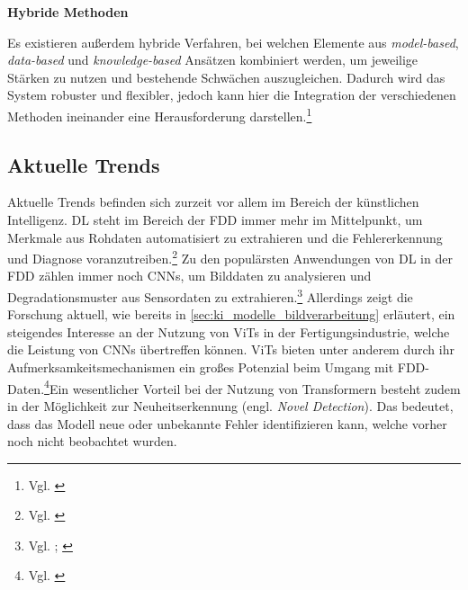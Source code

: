 \textbf{Hybride Methoden}

Es existieren außerdem hybride Verfahren, bei welchen Elemente aus \textit{model-based}, \textit{data-based} und \textit{knowledge-based} Ansätzen kombiniert werden, um jeweilige Stärken zu nutzen und bestehende Schwächen auszugleichen. Dadurch wird das System robuster und flexibler, jedoch kann hier die Integration der verschiedenen Methoden ineinander eine Herausforderung darstellen.\footnote{Vgl. \cite[S. 22 f.]{mercorelli_recent_2024}}

\subsection{Aktuelle Trends}
Aktuelle Trends befinden sich zurzeit vor allem im Bereich der künstlichen Intelligenz. \ac{DL} steht im Bereich der \ac{FDD} immer mehr im Mittelpunkt, um Merkmale aus Rohdaten automatisiert zu extrahieren und die Fehlererkennung und Diagnose voranzutreiben.\footnote{Vgl. \cite[S. 5991]{wen_new_2018}}
Zu den populärsten Anwendungen von \ac{DL} in der \ac{FDD} zählen immer noch \acp{CNN}, um Bilddaten zu analysieren und Degradationsmuster aus Sensordaten zu extrahieren.\footnote{Vgl. \cite{wu_transformer-based_2023}; \cite[S.  5991]{wen_new_2018}} Allerdings zeigt die Forschung aktuell, wie bereits in \ref{sec:ki_modelle_bildverarbeitung} erläutert, ein steigendes Interesse an der Nutzung von \acp{ViT} in der Fertigungsindustrie, welche die Leistung von \acp{CNN} übertreffen können. \acp{ViT} bieten unter anderem durch ihr Aufmerksamkeitsmechanismen ein großes Potenzial beim Umgang mit \ac{FDD}-Daten.\footnote{Vgl. \cite[S. 440]{wu_transformer-based_2023}}Ein wesentlicher Vorteil bei der Nutzung von Transformern besteht zudem in der Möglichkeit zur Neuheitserkennung (engl. \textit{Novel Detection}). Das bedeutet, dass das Modell neue oder unbekannte Fehler identifizieren kann, welche vorher noch nicht beobachtet wurden.

